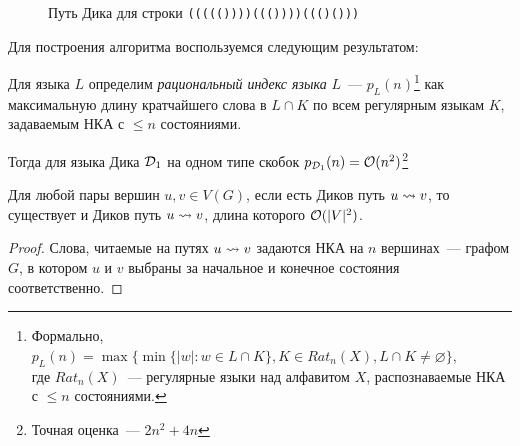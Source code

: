 \begin{figure}[h]
  \caption{Путь Дика для строки \texttt{((((())))((())))((()()))}}
  \label{img:dyck_path}
\end{figure}

Для построения алгоритма воспользуемся следующим результатом:

\begin{lemma}\label{lm:french}

  Для языка $L$ определим \textit{рациональный индекс языка} $L$~--- $p_L(n)$\footnote{Формально, $p_L(n) = \max \{ \min \{|w| \colon w \in L \cap K \}, K \in Rat_n(X), L \cap K \ne \varnothing \}$,\\ где $Rat_n(X)$~--- регулярные языки над алфавитом $X$, распознаваемые НКА с $\le n$ состояниями.} как максимальную длину кратчайшего слова в $L \cap K$ по всем регулярным языкам $K$, задаваемым НКА с $\le n$ состояниями.

  Тогда для языка Дика $\mathcal{D}_1$ на одном типе скобок $p_{\mathcal{D}_1}(n) = \mathcal{O}(n^2)$\footnote{Точная оценка~--- $2n^2 + 4n$}
\end{lemma}

\begin{corollary}
  Для любой пары вершин $u, v \in V(G)$, если есть Диков путь $u \rightsquigarrow v$, то существует и Диков путь $u \rightsquigarrow v$, длина которого $\mathcal{O}(|V|^2)$.
\end{corollary}
\begin{proof}
  Слова, читаемые на путях $u \rightsquigarrow v$ задаются НКА на $n$ вершинах~--- графом $G$, в котором $u$ и $v$ выбраны за начальное и конечное состояния соответственно.
\end{proof}

